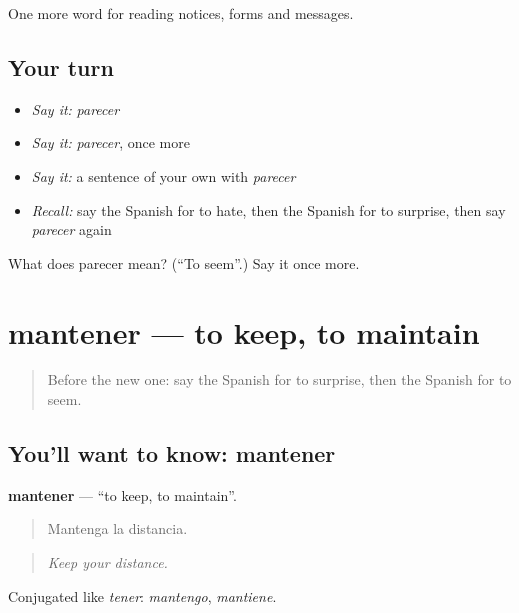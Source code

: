 \begin{grammarlens}[title={What you've built}]
One more word for reading notices, forms and messages.
\end{grammarlens}

\subsection*{Your turn}
\begin{itemize}
\raggedright
  \item \emph{Say it:} \emph{parecer}
  \item \emph{Say it:} \emph{parecer}, once more
  \item \emph{Say it:} a sentence of your own with \emph{parecer}
  \item \emph{Recall:} say the Spanish for to hate, then the Spanish for to surprise, then say \emph{parecer} again
\end{itemize}

\begin{tcolorbox}[breakable,colback=teal!4,colframe=teal!35!black,title={Before you move on}]
What does parecer mean? (\textquotedblleft{}To seem\textquotedblright{}.) Say it once more.
\end{tcolorbox}
\section[mantener]{mantener — to keep, to maintain}

\label{lesson:ES-C511-mantener}



\begin{quote}
Before the new one: say the Spanish for to surprise, then the Spanish for to seem.
\end{quote}

\subsection*{You'll want to know: mantener}
\textbf{mantener} — \textquotedblleft{}to keep, to maintain\textquotedblright{}.

\begin{quote}
Mantenga la distancia.
\end{quote}

\begin{quote}
\emph{Keep your distance.}
\end{quote}

Conjugated like \emph{tener}: \emph{mantengo}, \emph{mantiene}.

